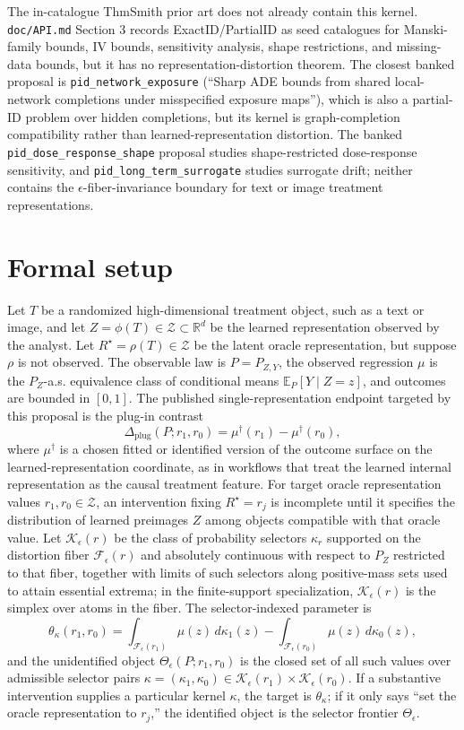 \documentclass[11pt]{article}
\newcommand{\E}{\mathbb{E}}
\theoremstyle{definition}
\theoremstyle{plain}
\theoremstyle{remark}
\begin{document}
The in-catalogue ThmSmith prior art does not already contain this kernel.  \texttt{doc/API.md} Section 3 records ExactID/PartialID as seed catalogues for Manski-family bounds, IV bounds, sensitivity analysis, shape restrictions, and missing-data bounds, but it has no representation-distortion theorem.  The closest banked proposal is \texttt{pid\_network\_exposure} (``Sharp ADE bounds from shared local-network completions under misspecified exposure maps''), which is also a partial-ID problem over hidden completions, but its kernel is graph-completion compatibility rather than learned-representation distortion.  The banked \texttt{pid\_dose\_response\_shape} proposal studies shape-restricted dose-response sensitivity, and \texttt{pid\_long\_term\_surrogate} studies surrogate drift; neither contains the \(\epsilon\)-fiber-invariance boundary for text or image treatment representations.

\section{Formal setup}
Let \(T\) be a randomized high-dimensional treatment object, such as a text or image, and let \(Z=\phi(T)\in\mathcal Z\subset\mathbb R^d\) be the learned representation observed by the analyst.  Let \(R^\star=\rho(T)\in\mathcal Z\) be the latent oracle representation, but suppose \(\rho\) is not observed.  The observable law is \(P=P_{Z,Y}\), the observed regression \(\mu\) is the \(P_Z\)-a.s. equivalence class of conditional means \(\E_P[Y\mid Z=z]\), and outcomes are bounded in \([0,1]\).  The published single-representation endpoint targeted by this proposal is the plug-in contrast
\[
\Delta_{\mathrm{plug}}(P;r_1,r_0)=\mu^\dagger(r_1)-\mu^\dagger(r_0),
\]
where \(\mu^\dagger\) is a chosen fitted or identified version of the outcome surface on the learned-representation coordinate, as in workflows that treat the learned internal representation as the causal treatment feature.  For target oracle representation values \(r_1,r_0\in\mathcal Z\), an intervention fixing \(R^\star=r_j\) is incomplete until it specifies the distribution of learned preimages \(Z\) among objects compatible with that oracle value.  Let \(\mathcal K_\epsilon(r)\) be the class of probability selectors \(\kappa_r\) supported on the distortion fiber \(\mathcal F_\epsilon(r)\) and absolutely continuous with respect to \(P_Z\) restricted to that fiber, together with limits of such selectors along positive-mass sets used to attain essential extrema; in the finite-support specialization, \(\mathcal K_\epsilon(r)\) is the simplex over atoms in the fiber.  The selector-indexed parameter is
\[
\theta_{\kappa}(r_1,r_0)
=
\int_{\mathcal F_\epsilon(r_1)}\mu(z)\,d\kappa_1(z)
-
\int_{\mathcal F_\epsilon(r_0)}\mu(z)\,d\kappa_0(z),
\]
and the unidentified object \(\Theta_\epsilon(P;r_1,r_0)\) is the closed set of all such values over admissible selector pairs \(\kappa=(\kappa_1,\kappa_0)\in\mathcal K_\epsilon(r_1)\times\mathcal K_\epsilon(r_0)\).  If a substantive intervention supplies a particular kernel \(\kappa\), the target is \(\theta_\kappa\); if it only says ``set the oracle representation to \(r_j\),'' the identified object is the selector frontier \(\Theta_\epsilon\).
\end{document}
